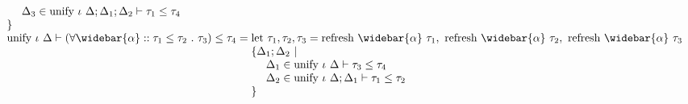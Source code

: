 \documentclass[manuscript]{acmart}
\begin{document}
\[\begin{array}{l @{} l}
\begin{array}[t]{@{} l}
      \ \ \ \ \Delta_3 \in \text{unify } \iota\ \Delta;\Delta_1;\Delta_2 \vdash \tau_1 \leq \tau_4
      \\ 
      \}
    \end{array}
    \\
    \text{unify } \iota\ \Delta \vdash
    (\forall \widebar{\alpha} :: \tau_1 \leq \tau_2\ .\ \tau_3)
    \leq 
    \tau_4
    &{} = 
    \begin{array}[t]{@{} l}
      \text{let } \tau_1, \tau_2, \tau_3 = 
      \text{refresh } \widebar{\alpha}\ \tau_1,\ 
      \text{refresh } \widebar{\alpha}\ \tau_2,\ 
      \text{refresh } \widebar{\alpha}\ \tau_3
      \\
      \{\Delta_1;\Delta_2\ |
      \\ 
      \ \ \ \ \Delta_1 \in \text{unify } \iota\ \Delta \vdash \tau_3 \leq \tau_4
      \\
      \ \ \ \ \Delta_2 \in \text{unify } \iota\ \Delta;\Delta_1 \vdash \tau_1 \leq \tau_2
      \\
      \}
    \end{array}

  \end{array}
\]
\end{document}
